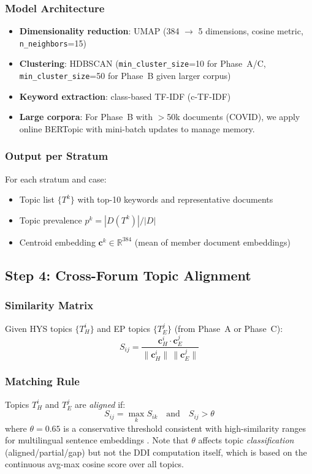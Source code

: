 \documentclass[sigconf,natbib]{acmart}
\begin{document}
\subsubsection{Model Architecture}
\begin{itemize}
  \item \textbf{Dimensionality reduction}: UMAP (384 $\rightarrow$ 5 dimensions, cosine metric,
        \texttt{n\_neighbors}=15)
  \item \textbf{Clustering}: HDBSCAN (\texttt{min\_cluster\_size}=10 for Phase~A/C,
        \texttt{min\_cluster\_size}=50 for Phase~B given larger corpus)
  \item \textbf{Keyword extraction}: class-based TF-IDF (c-TF-IDF)
  \item \textbf{Large corpora}: For Phase~B with $>$50k documents (COVID), we apply
        online BERTopic with mini-batch updates to manage memory.
\end{itemize}

\subsubsection{Output per Stratum}
For each stratum and case:
\begin{itemize}
  \item Topic list $\{T^k\}$ with top-10 keywords and representative documents
  \item Topic prevalence $p^k = |D(T^k)| / |D|$
  \item Centroid embedding $\mathbf{c}^k \in \mathbb{R}^{384}$ (mean of member document embeddings)
\end{itemize}

\subsection{Step 4: Cross-Forum Topic Alignment}

\subsubsection{Similarity Matrix}
Given HYS topics $\{T_H^i\}$ and EP topics $\{T_E^j\}$ (from Phase~A or Phase~C):
\begin{equation}
S_{ij} = \frac{\mathbf{c}_H^i \cdot \mathbf{c}_E^j}{\|\mathbf{c}_H^i\| \, \|\mathbf{c}_E^j\|}
\end{equation}

\subsubsection{Matching Rule}
Topics $T_H^i$ and $T_E^j$ are \textit{aligned} if:
\begin{equation}
S_{ij} = \max_k S_{ik} \quad \text{and} \quad S_{ij} > \theta
\end{equation}
where $\theta = 0.65$ is a conservative threshold consistent with high-similarity ranges
for multilingual sentence embeddings \citep[cf.][]{Reimers2019}.
Note that $\theta$ affects topic \textit{classification} (aligned/partial/gap) but not the
DDI computation itself, which is based on the continuous avg-max cosine score over all topics.
\end{document}
